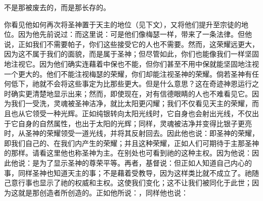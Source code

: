 不是那被废去的，而是那长存的。\par

\par

你看见他如何再次将圣神置于天主的地位（见下文），又将他们提升至宗徒的地位。因为他先前说过：而这里说：可是他们像梅瑟一样，带来了一条法律。但他说，正如我们不需要帕子，你们这些接受它的人也不需要。然而，这荣耀远更大，因为这不属于我们的面貌，而是属于圣神；但尽管如此，你们也能像我们一样坚固地注视它。因为他们确实连藉着中保也不能，但你们甚至不用中保就能坚固地注视一个更大的。他们不能注视梅瑟的荣耀，你们却能注视圣神的荣耀。倘若圣神有任何低下，祂就不会将这些事定为比那些更大。但是什么意思？这在奇迹神恩运行之时确实更清楚地显示出来；然而，即使现在，对有信德眼睛的人也不难看见它。因为我们一受洗，灵魂被圣神洁净，就比太阳更闪耀；我们不仅看见天主的荣耀，而且也从它领受一种光辉。正如纯银转向太阳光线时，它自身也会射出光线，不仅出于它自身的自然属性，也出于太阳的光辉；同样，灵魂被洁净并变得比银子更亮时，从圣神的荣耀领受一道光线，并将其反射回去。因此他也说：即圣神的荣耀，即我们自己的、在我们内产生的荣耀；并且这种荣耀，正如人们可期待于主那圣神的那样。请看这里他也称圣神为主。在别处也可看到祂的这种主权。因为他说：因此他说：是为了显示圣神的尊荣平等。再者，基督说：但正如人知道自己内心的事，同样圣神也知道天主的事；不是藉着受教导，因为这样类比就不成立了。祂随己意行事也显示了祂的权威和主权。这使我们变化；这不让我们被同化于此世；因为这就是那创造者所创造的。正如他所说：，同样他也说：\par

